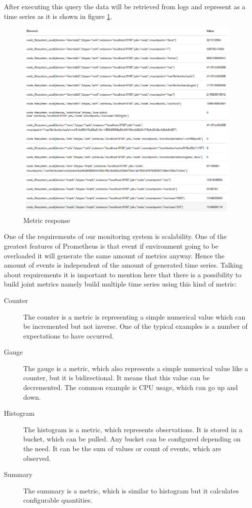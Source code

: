 After executing this query the data will be retrieved from logs and represent as a time series as it is shown in figure \ref{fig:monitoring_req}.



\begin{figure}[htbp]
\begin{center}
  \includegraphics[width=\linewidth]{components/3/monitoring_req.png}
  \caption{Metric response}
  \label{fig:monitoring_req}
\end{center}
\end{figure}

One of the requirements of our monitoring system is scalability. One of the greatest features of Prometheus is that event if environment going to be overloaded it will generate the same amount of metrics anyway. Hence the amount of events is independent of the amount of generated time series. 
Talking about requirements it is important to mention here that there is a possibility to build joint metrics namely build multiple time series using this kind of metric:

\begin{description}
\item[Counter] The counter is a metric is representing a simple numerical value which can be incremented but not inverse. One of the typical examples is a number of expectations to have occurred. 
\item[Gauge] The gauge is a metric, which also represents a simple numerical value like a counter, but it is bidirectional. It means that this value can be decremented. The common example is CPU usage, which can go up and down.
\item[Histogram] The histogram is a metric, which represents observations.  It is stored in a bucket, which can be pulled. Any bucket can be configured depending on the need. It can be the sum of values or count of events, which are observed.
\item[Summary] The summary is a metric, which is similar to histogram but it calculates configurable quantities. 
\end{description}


